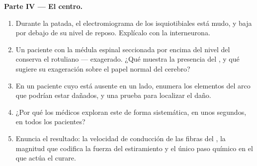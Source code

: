 \begin{problem}
\medskip
\noindent\textbf{Parte IV --- El centro.}
\begin{enumerate}[resume]
  \item Durante la patada, el electromiograma de los isquiotibiales
        está mudo, y baja por debajo de su nivel de reposo. Explícalo
        con la interneurona.
  \item Un paciente con la médula espinal seccionada por encima del
        nivel del  conserva el  rotuliano --- exagerado.
        ¿Qué muestra la presencia del , y qué sugiere su
        exageración sobre el papel normal del cerebro?
  \item En un paciente cuyo  está ausente en un lado, enumera
        los elementos del arco que podrían estar dañados, y una prueba
        para localizar el daño.
  \item ¿Por qué los médicos exploran este  de forma
        sistemática, en unos segundos, en todos los pacientes?
  \item Enuncia el resultado: la velocidad de conducción de las fibras
        del , la magnitud que codifica la fuerza del
        estiramiento y el único paso químico en el que actúa el curare.
\end{enumerate}
\end{problem}
